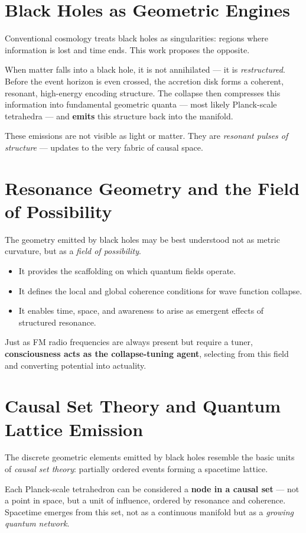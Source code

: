 \documentclass[12pt]{article}
\begin{document}
\section{Black Holes as Geometric Engines}
Conventional cosmology treats black holes as singularities: regions where information is lost and time ends. This work proposes the opposite.

When matter falls into a black hole, it is not annihilated — it is \emph{restructured}. Before the event horizon is even crossed, the accretion disk forms a coherent, resonant, high-energy encoding structure. The collapse then compresses this information into fundamental geometric quanta — most likely Planck-scale tetrahedra — and \textbf{emits} this structure back into the manifold.

These emissions are not visible as light or matter. They are \emph{resonant pulses of structure} — updates to the very fabric of causal space.

\section{Resonance Geometry and the Field of Possibility}
The geometry emitted by black holes may be best understood not as metric curvature, but as a \emph{field of possibility}.

\begin{itemize}[noitemsep,topsep=0.5em]
\item It provides the scaffolding on which quantum fields operate.
\item It defines the local and global coherence conditions for wave function collapse.
\item It enables time, space, and awareness to arise as emergent effects of structured resonance.
\end{itemize}

Just as FM radio frequencies are always present but require a tuner, \textbf{consciousness acts as the collapse-tuning agent}, selecting from this field and converting potential into actuality.

\section{Causal Set Theory and Quantum Lattice Emission}
The discrete geometric elements emitted by black holes resemble the basic units of \emph{causal set theory}: partially ordered events forming a spacetime lattice.

Each Planck-scale tetrahedron can be considered a \textbf{node in a causal set} — not a point in space, but a unit of influence, ordered by resonance and coherence. Spacetime emerges from this set, not as a continuous manifold but as a \emph{growing quantum network}.
\end{document}
